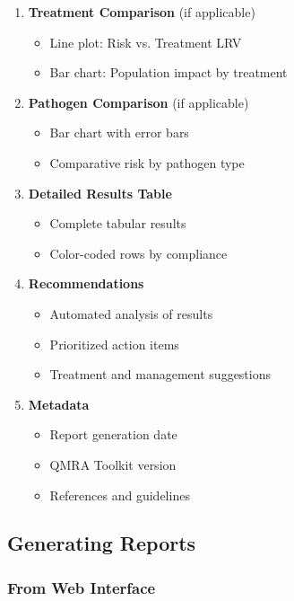 \documentclass[11pt,a4paper]{article}
\begin{document}
\begin{enumerate}[leftmargin=*]
    \item \textbf{Treatment Comparison} (if applicable)
    \begin{itemize}
        \item Line plot: Risk vs. Treatment LRV
        \item Bar chart: Population impact by treatment
    \end{itemize}

    \item \textbf{Pathogen Comparison} (if applicable)
    \begin{itemize}
        \item Bar chart with error bars
        \item Comparative risk by pathogen type
    \end{itemize}

    \item \textbf{Detailed Results Table}
    \begin{itemize}
        \item Complete tabular results
        \item Color-coded rows by compliance
    \end{itemize}

    \item \textbf{Recommendations}
    \begin{itemize}
        \item Automated analysis of results
        \item Prioritized action items
        \item Treatment and management suggestions
    \end{itemize}

    \item \textbf{Metadata}
    \begin{itemize}
        \item Report generation date
        \item QMRA Toolkit version
        \item References and guidelines
    \end{itemize}
\end{enumerate}

\subsection{Generating Reports}

\subsubsection{From Web Interface}
\end{document}
